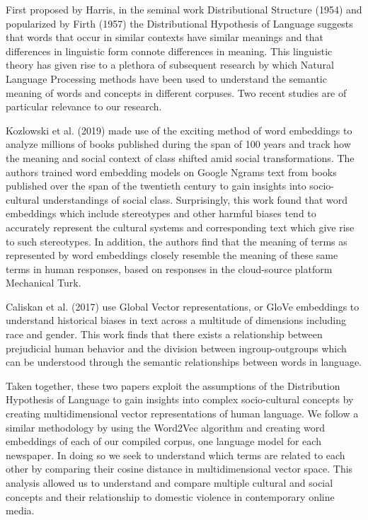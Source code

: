 \documentclass{article}
\begin{document}
{First proposed by Harris, in the seminal work Distributional Structure  (1954)  and popularized by Firth (1957)  the Distributional Hypothesis of Language suggests that words that occur in similar contexts have similar meanings and that differences in linguistic form connote differences in meaning. This linguistic theory has given rise to a plethora of subsequent research by which Natural Language Processing methods have been used to understand the semantic meaning of words and concepts in different corpuses. Two recent studies are of particular relevance to our research.

Kozlowski et al. (2019) made use of the exciting method of word embeddings to analyze millions of books published during the span of 100 years and track how the meaning and social context of class shifted amid social transformations.  The authors trained word embedding models on Google Ngrams text from books published over the span of the twentieth century to gain insights into socio-cultural understandings of social class. Surprisingly, this work found that word embeddings which include stereotypes and other harmful biases tend to accurately represent the cultural systems and corresponding text which give rise to such stereotypes. In addition, the authors find that the meaning of terms as represented by word embeddings closely resemble the meaning of these same terms in human responses, based on responses in the cloud-source platform Mechanical Turk. 

Caliskan et al. (2017) use Global Vector representations, or GloVe embeddings to understand historical biases in text across a multitude of dimensions including race and gender. This work finds that there exists a relationship between prejudicial human behavior and the division between ingroup-outgroups which can be understood through the semantic relationships between words in language.

Taken together, these two papers exploit the assumptions of the Distribution Hypothesis of Language to gain insights into complex socio-cultural concepts by creating multidimensional vector representations of human language. We follow a similar methodology by using the Word2Vec algorithm and creating word embeddings of each of our compiled corpus, one language model for each newspaper. In doing so we seek to understand which terms are related to each other by comparing their cosine distance in multidimensional vector space.  This analysis allowed us to understand and compare multiple cultural and social concepts and their relationship to domestic violence in contemporary online media. 


}
\newpage
\end{document}
